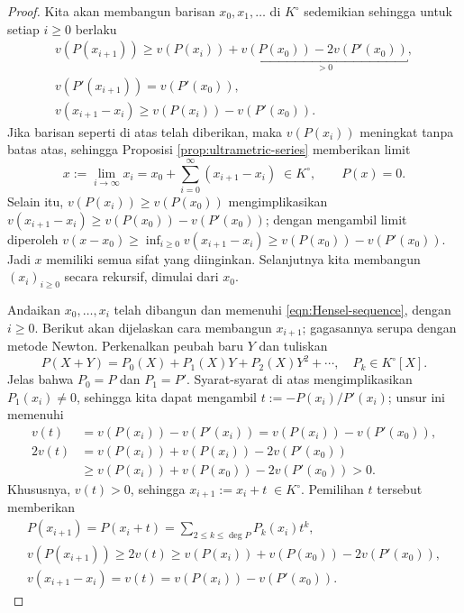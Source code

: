 \begin{proof}
	Kita akan membangun barisan $x_0, x_1, \ldots$ di $K^\circ$ sedemikian sehingga untuk setiap $i \geq 0$ berlaku
	\begin{equation}\label{eqn:Hensel-sequence} \begin{gathered}
		v(P(x_{i+1})) \geq v(P(x_i)) + \underbracket{v(P(x_0)) - 2 v(P'(x_0))}_{>0}, \\
		v(P'(x_{i+1})) = v(P'(x_0)), \\
		v(x_{i+1} - x_i) \geq v(P(x_i)) - v(P'(x_0)).
	\end{gathered}\end{equation}
	Jika barisan seperti di atas telah diberikan, maka $v(P(x_i))$ meningkat tanpa batas atas, sehingga Proposisi \ref{prop:ultrametric-series} memberikan limit
	\[ x := \lim_{i \to \infty} x_i = x_0 + \sum_{i=0}^\infty (x_{i+1}-x_i)\; \in K^\circ, \qquad P(x)=0. \]
	Selain itu, $v(P(x_i)) \geq v(P(x_0))$ mengimplikasikan $v(x_{i+1} - x_i) \geq v(P(x_0)) - v(P'(x_0))$; dengan mengambil limit diperoleh $v(x - x_0) \geq \inf_{i \geq 0} v(x_{i+1} - x_i) \geq v(P(x_0)) - v(P'(x_0))$. Jadi $x$ memiliki semua sifat yang diinginkan. Selanjutnya kita membangun $(x_i)_{i \geq 0}$ secara rekursif, dimulai dari $x_0$.

	Andaikan $x_0, \ldots, x_i$ telah dibangun dan memenuhi \eqref{eqn:Hensel-sequence}, dengan $i \geq 0$. Berikut akan dijelaskan cara membangun $x_{i+1}$; gagasannya serupa dengan metode Newton. Perkenalkan peubah baru $Y$ dan tuliskan
	\[ P(X+Y) = P_0(X) + P_1(X) Y + P_2(X) Y^2 + \cdots, \quad P_k \in K^\circ[X]. \]
	Jelas bahwa $P_0 = P$ dan $P_1 = P'$. Syarat-syarat di atas mengimplikasikan $P_1(x_i) \neq 0$, sehingga kita dapat mengambil $t := -P(x_i)/P'(x_i)$; unsur ini memenuhi
	\begin{align*}
		v(t) & = v(P(x_i)) - v(P'(x_i)) = v(P(x_i)) - v(P'(x_0)), \\
		2v(t) & = v(P(x_i)) + v(P(x_i)) - 2v(P'(x_0)) \\
		& \geq v(P(x_i)) + v(P(x_0)) - 2v(P'(x_0)) > 0.
	\end{align*}
	Khususnya, $v(t) > 0$, sehingga $x_{i+1} := x_i + t \;\in K^\circ$. Pemilihan $t$ tersebut memberikan
	\begin{gather*}
		P(x_{i+1}) = P(x_i + t) = \sum_{2 \leq k \leq \deg P} P_k(x_i) t^k, \\
		v(P(x_{i+1})) \geq 2v(t) \geq v(P(x_i)) + v(P(x_0)) - 2v(P'(x_0)), \\
		v(x_{i+1} - x_i) = v(t) = v(P(x_i)) - v(P'(x_0)).
	\end{gather*}


\end{proof}
